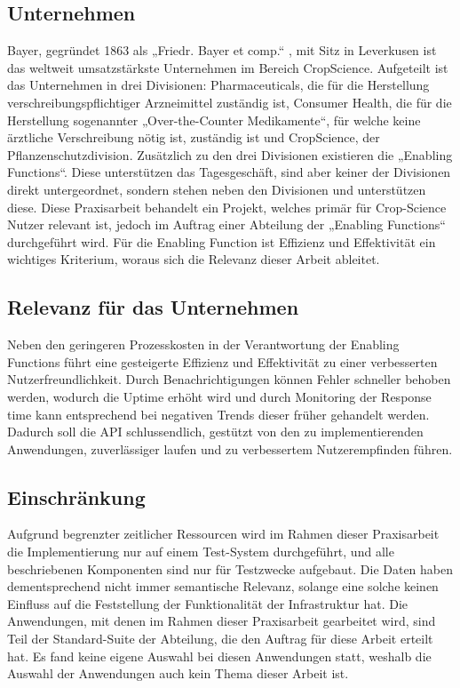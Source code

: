 \subsection{Unternehmen}
Bayer, gegründet 1863 als „Friedr. Bayer et comp.“ , mit Sitz in Leverkusen ist das weltweit umsatzstärkste Unternehmen im Bereich CropScience. Aufgeteilt ist das Unternehmen in drei Divisionen: Pharmaceuticals, die für die Herstellung verschreibungspflichtiger Arzneimittel zuständig ist, Consumer Health, die für die Herstellung sogenannter „Over-the-Counter Medikamente“, für welche keine ärztliche Verschreibung nötig ist, zuständig ist und CropScience, der Pflanzenschutzdivision. Zusätzlich zu den drei Divisionen existieren die „Enabling Functions“. Diese unterstützen das Tagesgeschäft, sind aber keiner der Divisionen direkt untergeordnet, sondern stehen neben den Divisionen und unterstützen diese. Diese Praxisarbeit behandelt ein Projekt, welches primär für Crop-Science Nutzer relevant ist, jedoch im Auftrag einer Abteilung der „Enabling Functions“ durchgeführt wird. Für die Enabling Function ist Effizienz und Effektivität ein wichtiges Kriterium, woraus sich die Relevanz dieser Arbeit ableitet.
\subsection{Relevanz für das Unternehmen}
Neben den geringeren Prozesskosten in der Verantwortung der Enabling Functions führt eine gesteigerte Effizienz und Effektivität zu einer verbesserten Nutzerfreundlichkeit. Durch Benachrichtigungen können Fehler schneller behoben werden, wodurch die Uptime erhöht wird und durch Monitoring der Response time kann entsprechend bei negativen Trends dieser früher gehandelt werden. Dadurch soll die API schlussendlich, gestützt von den zu implementierenden Anwendungen, zuverlässiger laufen und zu verbessertem Nutzerempfinden führen.
\subsection{Einschränkung}
Aufgrund begrenzter zeitlicher Ressourcen wird im Rahmen dieser Praxisarbeit die Implementierung nur auf einem Test-System durchgeführt, und alle beschriebenen Komponenten sind nur für Testzwecke aufgebaut. Die Daten haben dementsprechend nicht immer semantische Relevanz, solange eine solche keinen Einfluss auf die Feststellung der Funktionalität der Infrastruktur hat. Die Anwendungen, mit denen im Rahmen dieser Praxisarbeit gearbeitet wird, sind Teil der Standard-Suite der Abteilung, die den Auftrag für diese Arbeit erteilt hat. Es fand keine eigene Auswahl bei diesen Anwendungen statt, weshalb die Auswahl der Anwendungen auch kein Thema dieser Arbeit ist.